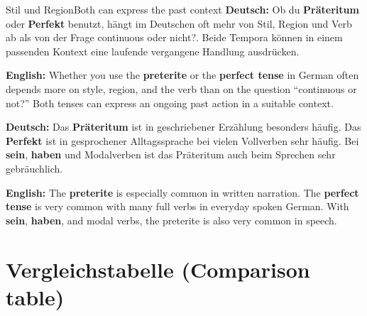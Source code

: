 \documentclass[a4paper,11pt]{article}
\newcommand{\GermanText}[1]{\textbf{Deutsch: }#1\par}
\newcommand{\EnglishText}[1]{{\small\color{SoftGray}\textbf{English: }#1\par}}
\begin{document}
        \begin{grammarentry}{Stil und Region}{Both can express the past context}
            \GermanText{Ob du \textbf{Präteritum} oder \textbf{Perfekt} benutzt, hängt im Deutschen oft mehr von Stil, Region und Verb ab als von der Frage \glqq continuous oder nicht?\grqq. Beide Tempora können in einem passenden Kontext eine laufende vergangene Handlung ausdrücken.}
            \EnglishText{Whether you use the \textbf{preterite} or the \textbf{perfect tense} in German often depends more on style, region, and the verb than on the question ``continuous or not?'' Both tenses can express an ongoing past action in a suitable context.}

            \GermanText{Das \textbf{Präteritum} ist in geschriebener Erzählung besonders häufig. Das \textbf{Perfekt} ist in gesprochener Alltagssprache bei vielen Vollverben sehr häufig. Bei \textbf{sein}, \textbf{haben} und Modalverben ist das Präteritum auch beim Sprechen sehr gebräuchlich.}
            \EnglishText{The \textbf{preterite} is especially common in written narration. The \textbf{perfect tense} is very common with many full verbs in everyday spoken German. With \textbf{sein}, \textbf{haben}, and modal verbs, the preterite is also very common in speech.}
        \end{grammarentry}

    \section{Vergleichstabelle \textnormal{(Comparison table)}}
\end{document}

